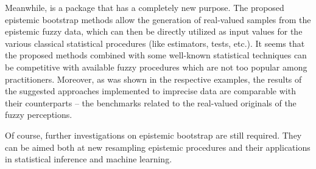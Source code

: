 Meanwhile,  is a package that has a completely new purpose. The proposed epistemic bootstrap methods allow the generation of real-valued samples from the epistemic fuzzy data, which can then be directly utilized as input values for the various classical statistical procedures (like estimators, tests, etc.). It seems that the proposed methods combined with some well-known statistical techniques can be competitive with available fuzzy procedures which are not too popular among practitioners. Moreover, as was shown in the respective examples, the results of the suggested approaches implemented to imprecise data are comparable with their counterparts -- the benchmarks related to the real-valued originals of the fuzzy perceptions.

Of course, further investigations on epistemic bootstrap are still required. They can be aimed both at new resampling epistemic procedures and their applications in statistical inference and machine learning.








  \address{Maciej Romaniuk\\
    Systems Research Institute Polish Academy of Sciences\\
    Newelska 6, 01-447 Warsaw\\
    Poland\\
	WIT Academy\\
    Newelska 6, 01-447 Warsaw\\
    Poland\\
    (0000-0001-9649-396X)\\
    }

  \address{Przemys{\l}aw Grzegorzewski\\
    Faculty of Mathematics and Information Science, Warsaw University of Technology \\
    Koszykowa 75, 00-662 Warsaw\\
    Poland\\
    Systems Research Institute Polish Academy of Sciences\\
    Newelska 6, 01-447 Warsaw\\
    Poland\\
    (0000-0002-5191-4123)\\
    }

   \address{Abbas Parchami\\
       Department of Statistics, Faculty of Mathematics and Computer\\
       Shahid Bahonar University of Kerman, Kerman\\
       Iran\\
       (0000-0002-0593-7324)\\
       }
